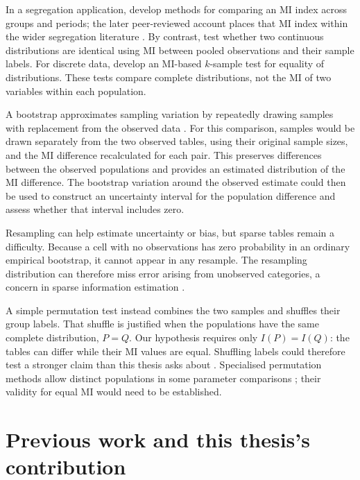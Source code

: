In a segregation application, \citet{mora2009} develop methods for comparing
an MI index across groups and periods; the later peer-reviewed account
places that MI index within the wider segregation literature \citep{mora2011}.
By contrast, \citet{guha2014} test whether two continuous distributions are identical
using MI between pooled observations and their sample labels.
For discrete data, \citet{drake2014} develop an MI-based \(k\)-sample test
for equality of distributions. These tests compare complete distributions,
not the MI of two variables within each population.

\medskip
{}

A bootstrap approximates sampling variation by repeatedly drawing samples
with replacement from the observed data \citep{efron1979}. For this
comparison, samples would be drawn separately from the two observed tables,
using their original sample sizes, and the MI difference recalculated for
each pair. This preserves differences between the observed populations and
provides an estimated distribution of the MI difference. The bootstrap
variation around the observed estimate could then be used to construct
an uncertainty interval for the population difference and assess whether
that interval includes zero.

Resampling can help estimate uncertainty or bias, but sparse tables remain
a difficulty. Because a cell with no observations has zero probability
in an ordinary empirical bootstrap, it cannot appear in any resample.
The resampling distribution can therefore miss error arising from
unobserved categories, a concern in sparse information estimation
\citep{paninski2003}.

A simple permutation test instead combines the two samples and shuffles
their group labels. That shuffle is justified when
the populations have the same complete distribution, \(P=Q\). Our hypothesis
requires only \(I(P)=I(Q)\): the tables can differ while their MI values are
equal. Shuffling labels could therefore test a stronger claim than this thesis
asks about \citep{chung2013}. Specialised permutation methods allow distinct
populations in some parameter comparisons \citep{janssen1997,chung2013};
their validity for equal MI would need to be established.

\section{Previous work and this thesis's contribution}

